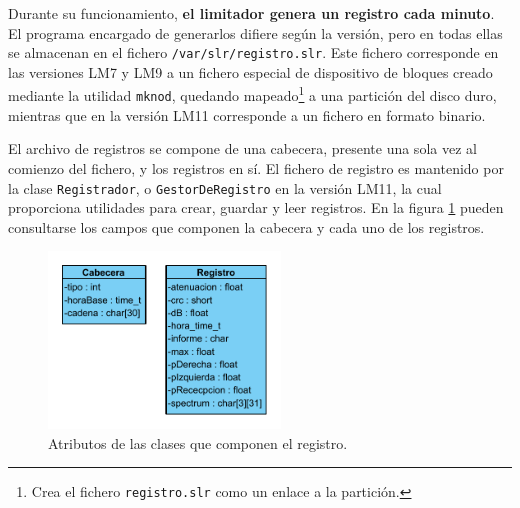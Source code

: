 
Durante su funcionamiento, \textbf{el limitador genera un registro cada minuto}. El programa encargado de generarlos difiere según la versión, pero en todas ellas se almacenan en el fichero \verb|/var/slr/registro.slr|. Este fichero corresponde en las versiones LM7 y LM9 a un fichero especial de dispositivo de bloques creado mediante la utilidad \verb|mknod|, quedando mapeado\footnote{Crea el fichero \texttt{registro.slr} como un enlace a la partición.} a una partición del disco duro, mientras que en la versión LM11 corresponde a un fichero en formato binario.

El archivo de registros se compone de una cabecera, presente una sola vez al comienzo del fichero, y los registros en sí. El fichero de registro es mantenido por la clase \verb|Registrador|, o \verb|GestorDeRegistro| en la versión LM11, la cual proporciona utilidades para crear, guardar y leer registros. En la figura \ref{fig:lms11-registry-attributes} pueden consultarse los campos que componen la cabecera y cada uno de los registros.

\begin{figure}[h]
	\centering
    \includegraphics[width=0.55\textwidth]{figuras/lms11-registry-attributes.pdf}
    \caption{Atributos de las clases que componen el registro.}
    \label{fig:lms11-registry-attributes}
\end{figure}